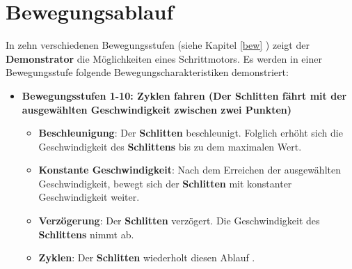 %
%


\chapter{Bewegungsablauf}

In zehn verschiedenen Bewegungsstufen (siehe Kapitel \ref{bew} ) zeigt der \textbf{Demonstrator} die Möglichkeiten eines Schrittmotors. Es werden in einer Bewegungsstufe folgende Bewegungscharakteristiken demonstriert:  

\begin{itemize}
	\item \textbf{Bewegungsstufen 1-10: Zyklen fahren (Der \textbf{Schlitten} fährt mit der ausgewählten Geschwindigkeit zwischen zwei Punkten)}
	\begin{itemize}
		\item\textbf{Beschleunigung}: Der \textbf{Schlitten} beschleunigt. Folglich erhöht sich die Geschwindigkeit des \textbf{Schlittens} bis zu dem maximalen Wert. 
		\item\textbf{Konstante Geschwindigkeit}: Nach dem Erreichen der ausgewählten Geschwindigkeit, bewegt sich der \textbf{Schlitten} mit konstanter Geschwindigkeit weiter.
		\item\textbf{Verzögerung}: Der \textbf{Schlitten} verzögert. Die Geschwindigkeit des \textbf{Schlittens} nimmt ab.
		\item\textbf{Zyklen}: Der \textbf{Schlitten} wiederholt diesen Ablauf .
	\end{itemize}
\end{itemize}



